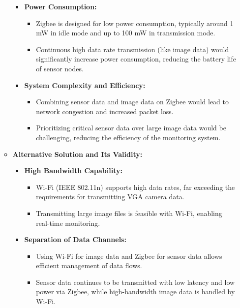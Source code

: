 \documentclass{article}
\begin{document}
\begin{enumerate}
\begin{itemize}
\begin{itemize}
        \item \textbf{Power Consumption:}
        \begin{itemize}
            \item Zigbee is designed for low power consumption, typically around 1 mW in idle mode and up to 100 mW in transmission mode.
            \item Continuous high data rate transmission (like image data) would significantly increase power consumption, reducing the battery life of sensor nodes.
        \end{itemize}
        
        \item \textbf{System Complexity and Efficiency:}
        \begin{itemize}
            \item Combining sensor data and image data on Zigbee would lead to network congestion and increased packet loss.
            \item Prioritizing critical sensor data over large image data would be challenging, reducing the efficiency of the monitoring system.
        \end{itemize}
    \end{itemize}

    \item \textbf{Alternative Solution and Its Validity:}
    \begin{itemize}
        \item \textbf{High Bandwidth Capability:}
        \begin{itemize}
            \item Wi-Fi (IEEE 802.11n) supports high data rates, far exceeding the requirements for transmitting VGA camera data.
            \item Transmitting large image files is feasible with Wi-Fi, enabling real-time monitoring.
        \end{itemize}
        
        \item \textbf{Separation of Data Channels:}
        \begin{itemize}
            \item Using Wi-Fi for image data and Zigbee for sensor data allows efficient management of data flows.
            \item Sensor data continues to be transmitted with low latency and low power via Zigbee, while high-bandwidth image data is handled by Wi-Fi.
        \end{itemize}
        

\end{itemize}
\end{itemize}
\end{enumerate}
\end{document}
